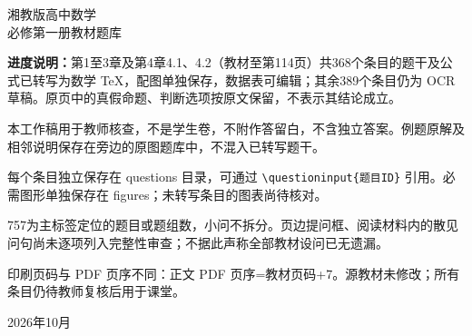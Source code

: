 

\frontmatter
\begin{titlepage}\centering\vspace*{22mm}
{\Huge 湘教版高中数学\\[5mm]必修第一册教材题库\par}
\vspace{14mm}{\Large 题干与公式可编辑的转写工作稿\par}
\vspace{12mm}{\large 757 个已定位条目；期中范围368个条目已对照原页转写\par}
\vspace{10mm}\begin{minipage}{0.88\textwidth}
\textbf{进度说明：}第1至3章及第4章4.1、4.2（教材至第114页）共368个条目的题干及公式已转写为数学 TeX，配图单独保存，数据表可编辑；其余389个条目仍为 OCR 草稿。原页中的真假命题、判断选项按原文保留，不表示其结论成立。
\par 本工作稿用于教师核查，不是学生卷，不附作答留白，不含独立答案。例题原解及相邻说明保存在旁边的原图题库中，不混入已转写题干。
\par 每个条目独立保存在 questions 目录，可通过 \texttt{\textbackslash questioninput\{题目ID\}} 引用。必需图形单独保存在 figures；未转写条目的图表尚待核对。
\par 757为主标签定位的题目或题组数，小问不拆分。页边提问框、阅读材料内的散见问句尚未逐项列入完整性审查；不据此声称全部教材设问已无遗漏。
\par 印刷页码与 PDF 页序不同：正文 PDF 页序=教材页码+7。源教材未修改；所有条目仍待教师复核后用于课堂。
\end{minipage}\vfill{\large 2026年10月}\end{titlepage}
\tableofcontents\mainmatter









